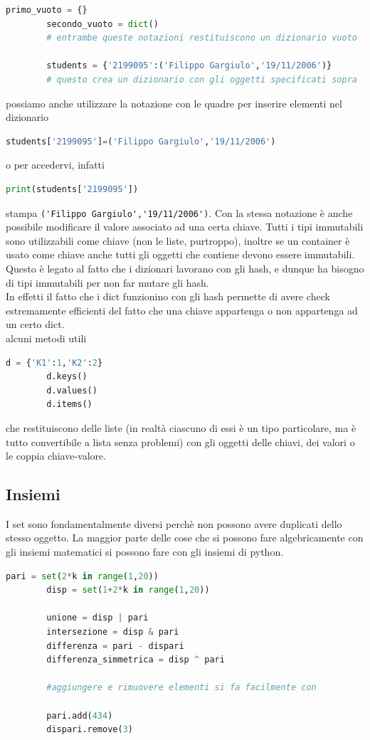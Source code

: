 \documentclass[11pt]{scrartcl}
\begin{document}
	\begin{lstlisting}[language=Python]
		primo_vuoto = {}
		secondo_vuoto = dict()
		# entrambe queste notazioni restituiscono un dizionario vuoto
		
		students = {'2199095':('Filippo Gargiulo','19/11/2006')}
		# questo crea un dizionario con gli oggetti specificati sopra
	\end{lstlisting}
	possiamo anche utilizzare la notazione con le quadre per inserire elementi nel dizionario
	\begin{lstlisting}[language=Python]
		students['2199095']=('Filippo Gargiulo','19/11/2006')
	\end{lstlisting}
	o per accedervi, infatti
	\begin{lstlisting}[language=Python]
		print(students['2199095'])
	\end{lstlisting}
	stampa \verb|('Filippo Gargiulo','19/11/2006')|. Con la stessa notazione è anche possibile modificare il valore associato ad una certa chiave. Tutti i tipi immutabili sono utilizzabili come chiave (non le liste, purtroppo), inoltre se un container è usato come chiave anche tutti gli oggetti che contiene devono essere immutabili. Questo è legato al fatto che i dizionari lavorano con gli hash, e dunque ha bisogno di tipi immutabili per non far mutare gli hash. \\
	In effetti il fatto che i dict funzionino con gli hash permette di avere check estremamente efficienti del fatto che una chiave appartenga o non appartenga ad un certo dict. \\
	alcuni metodi utili
	\begin{lstlisting}[language=Python]
		d = {'K1':1,'K2':2}
		d.keys()
		d.values()
		d.items()
	\end{lstlisting}
	che restituiscono delle liste (in realtà ciascuno di essi è un tipo particolare, ma è tutto convertibile a lista senza problemi) con gli oggetti delle chiavi, dei valori o le coppia chiave-valore.
	\subsection{Insiemi}
	I set sono fondamentalmente diversi perchè non possono avere duplicati dello stesso oggetto. La maggior parte delle cose che si possono fare algebricamente con gli insiemi matematici si possono fare con gli insiemi di python.
	\begin{lstlisting}[language=Python]
		pari = set(2*k in range(1,20))
		disp = set(1+2*k in range(1,20))
		
		unione = disp | pari 		
		intersezione = disp & pari 	
		differenza = pari - dispari
		differenza_simmetrica = disp ^ pari
		
		#aggiungere e rimuovere elementi si fa facilmente con
		
		pari.add(434)
		dispari.remove(3)
	\end{lstlisting}
	
\end{document}
